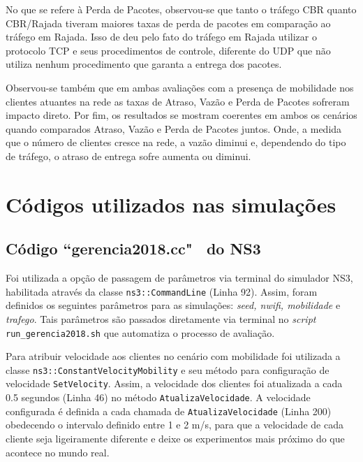 \documentclass[12pt]{article}
\begin{document}
No que se refere à Perda de Pacotes, observou-se que tanto o tráfego CBR quanto CBR/Rajada tiveram maiores taxas de perda de pacotes em comparação ao tráfego em Rajada. Isso de deu pelo fato do tráfego em Rajada utilizar o protocolo TCP e seus procedimentos de controle, diferente do UDP que não utiliza nenhum procedimento que garanta a entrega dos pacotes.

Observou-se também que em ambas avaliações com a presença de mobilidade nos clientes atuantes na rede as taxas de Atraso, Vazão e Perda de Pacotes sofreram impacto direto. Por fim, os resultados se mostram coerentes em ambos os cenários quando comparados Atraso, Vazão e Perda de Pacotes juntos. Onde, a medida que o número de clientes cresce na rede, a vazão diminui e, dependendo do tipo de tráfego, o atraso de entrega sofre aumenta ou diminui. 




\newpage

\section*{Códigos utilizados nas simulações}
\label{codigofonte}

\subsection*{Código ``gerencia2018.cc" ~do NS3}

Foi utilizada a opção de passagem de parâmetros via terminal do simulador NS3, habilitada através da classe \texttt{ns3::CommandLine} (Linha 92). Assim, foram definidos os seguintes parâmetros para as simulações: \textit{seed, nwifi, mobilidade} e \textit{trafego}. Tais parâmetros são passados diretamente via terminal no \textit{script} \texttt{run\_gerencia2018.sh} que automatiza o processo de avaliação.

Para atribuir velocidade aos clientes no cenário com mobilidade foi utilizada a classe \texttt{ns3::ConstantVelocityMobility} e seu método para configuração de velocidade \texttt{SetVelocity}. Assim, a velocidade dos clientes foi atualizada a cada 0.5 segundos (Linha 46) no método \texttt{AtualizaVelocidade}. A velocidade configurada é definida a cada chamada de \texttt{AtualizaVelocidade} (Linha 200) obedecendo o intervalo definido entre 1 e 2 m/s, para que a velocidade de cada cliente seja ligeiramente diferente e deixe os experimentos mais próximo do que acontece no mundo real.
\end{document}
